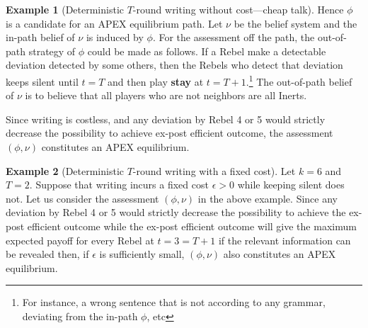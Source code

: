 \documentclass[12pt,letter]{article}
\theoremstyle{definition}
\newtheorem{example}{Example}
\theoremstyle{remark}
\theoremstyle{claim}
\begin{document}
\begin{example}[Deterministic $T$-round writing without cost---cheap talk]
Hence $\phi$ is a candidate for an APEX equilibrium path. Let $\nu$ be the belief system and the in-path belief of $\nu$ is induced by $\phi$. For the assessment off the path, the out-of-path strategy of $\phi$ could be made as follows. If a Rebel make a detectable deviation detected by some others, then the Rebels who detect that deviation keeps silent until $t=T$ and then play \textbf{stay} at $t=T+1$.\footnote{For instance, a wrong sentence that is not according to any grammar, deviating from the in-path $\phi$, etc} 
The out-of-path belief of $\nu$ is to believe that all players who are not neighbors are all Inerts. 

Since writing is costless, and any deviation by Rebel 4 or 5 would strictly decrease the possibility to achieve ex-post efficient outcome, the assessment $(\phi,\nu)$ constitutes an APEX equilibrium.

\end{example}


\begin{example}[Deterministic $T$-round writing with a fixed cost]
\label{ex:fixed_cost_talk}
Let $k=6$ and $T=2$. Suppose that writing incurs a fixed cost $\epsilon>0$ while keeping silent does not. Let us consider the assessment $(\phi,\nu)$ in the above example. Since any deviation by Rebel 4 or 5 would strictly decrease the possibility to achieve the ex-post efficient outcome while the ex-post efficient outcome will give the maximum expected payoff for every Rebel at $t=3=T+1$ if the relevant information can be revealed then, if $\epsilon$ is sufficiently small, $(\phi,\nu)$ also constitutes an APEX equilibrium.

\end{example}
\end{document}
